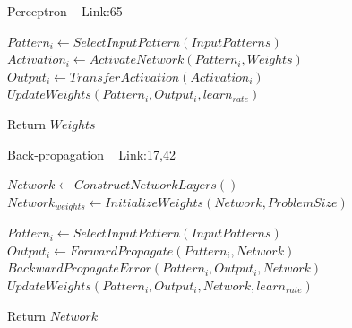\documentclass[a4paper]{article}
\begin{document}
  \begin{algorithm}
   \caption{Perceptron ~\cite{perceptron1} Link:{65}}
    \begin{algorithmic}[1]
    
            \State $Pattern_i \leftarrow SelectInputPattern(InputPatterns)$
            \State $Activation_i \leftarrow ActivateNetwork(Pattern_i,Weights)$
            \State $Output_i \leftarrow TransferActivation(Activation_i)$
            \State $UpdateWeights(Pattern_i,Output_i,learn_{rate})$
        \EndFor
        
       
       \State Return $Weights$



 

\end{algorithmic}
\end{algorithm}


  \begin{algorithm}
   \caption{Back-propagation  ~\cite{backpropagation12} Link:17,42}
    \begin{algorithmic}[1]
     \State $Network \leftarrow ConstructNetworkLayers()$
     \State $Network_{weights} \leftarrow InitializeWeights(Network,ProblemSize)$
    
            \State $Pattern_i \leftarrow SelectInputPattern(InputPatterns)$
            \State $Output_i \leftarrow ForwardPropagate(Pattern_i,Network)$
            \State $BackwardPropagateError(Pattern_i,Output_i,Network)$
            \State $UpdateWeights(Pattern_i,Output_i,Network,learn_{rate})$
        \EndFor
        
       
       \State Return $Network$



 

\end{algorithmic}
\end{algorithm}
\end{document}
